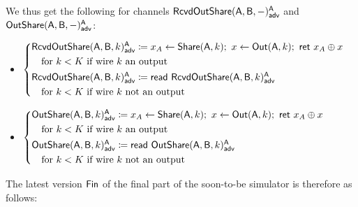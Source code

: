 We thus get the following for channels $\mathsf{RcvdOutShare}(\mathsf{A},\mathsf{B},-)^{\mathsf{A}}_{\mathsf{adv}}$ and $\mathsf{OutShare}(\mathsf{A},\mathsf{B},-)^{\mathsf{A}}_{\mathsf{adv}}$: 
\begin{itemize}
\item {\color{blue} $\begin{cases*} \LeakRcvdOutShare(\A,\B,k)^\A_\adv \coloneqq x_A \leftarrow \Share(\A,k); \ x \leftarrow \Out(\A,k); \ \ret{x_A \oplus x} \\ \hspace{10pt} \text{for $k < K$ if wire $k$ an output} \\ \LeakRcvdOutShare(\A,\B,k)^\A_\adv \coloneqq \read{\LeakRcvdOutShare(\A,\B,k)^\A_\adv} \\ \hspace{10pt} \text{for $k < K$ if wire $k$ not an output} \end{cases*}$}
\item {\color{blue} $\begin{cases*} \LeakOutShare(\A,\B,k)^\A_\adv \coloneqq x_A \leftarrow \Share(\A,k); \ x \leftarrow \Out(\A,k); \ \ret{x_A \oplus x} \\ \hspace{10pt} \text{for $k < K$ if wire $k$ an output} \\ \LeakOutShare(\A,\B,k)^\A_\adv \coloneqq \read{\LeakOutShare(\A,\B,k)^\A_\adv} \\ \hspace{10pt} \text{for $k < K$ if wire $k$ not an output} \end{cases*}$}
\end{itemize}
The latest version $\mathsf{Fin}$ of the final part of the soon-to-be simulator is therefore as follows:

